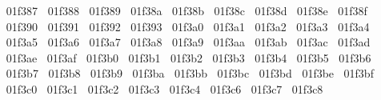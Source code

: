 {  ^^^^^^01f387%
  ^^^^^^01f388%
  ^^^^^^01f389%
  ^^^^^^01f38a%
  ^^^^^^01f38b%
  ^^^^^^01f38c%
  ^^^^^^01f38d%
  ^^^^^^01f38e%
  ^^^^^^01f38f%
  ^^^^^^01f390%
  ^^^^^^01f391%
  ^^^^^^01f392%
  ^^^^^^01f393%
  ^^^^^^01f3a0%
  ^^^^^^01f3a1%
  ^^^^^^01f3a2%
  ^^^^^^01f3a3%
  ^^^^^^01f3a4%
  ^^^^^^01f3a5%
  ^^^^^^01f3a6%
  ^^^^^^01f3a7%
  ^^^^^^01f3a8%
  ^^^^^^01f3a9%
  ^^^^^^01f3aa%
  ^^^^^^01f3ab%
  ^^^^^^01f3ac%
  ^^^^^^01f3ad%
  ^^^^^^01f3ae%
  ^^^^^^01f3af%
  ^^^^^^01f3b0%
  ^^^^^^01f3b1%
  ^^^^^^01f3b2%
  ^^^^^^01f3b3%
  ^^^^^^01f3b4%
  ^^^^^^01f3b5%
  ^^^^^^01f3b6%
  ^^^^^^01f3b7%
  ^^^^^^01f3b8%
  ^^^^^^01f3b9%
  ^^^^^^01f3ba%
  ^^^^^^01f3bb%
  ^^^^^^01f3bc%
  ^^^^^^01f3bd%
  ^^^^^^01f3be%
  ^^^^^^01f3bf%
  ^^^^^^01f3c0%
  ^^^^^^01f3c1%
  ^^^^^^01f3c2%
  ^^^^^^01f3c3%
  ^^^^^^01f3c4%
  ^^^^^^01f3c6%
  ^^^^^^01f3c7%
  ^^^^^^01f3c8%
}
